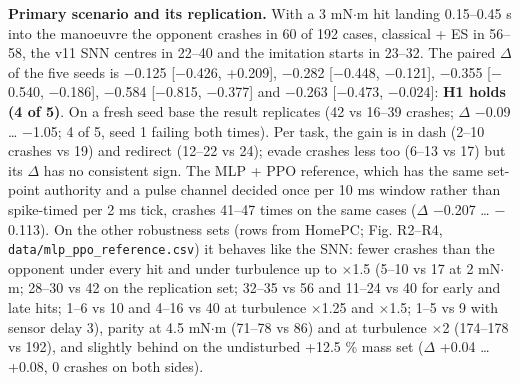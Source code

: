 \documentclass[10pt,a4paper]{article}
\begin{document}
\textbf{Primary scenario and its replication.} With a 3 mN$\cdot$m hit landing 0.15--0.45 s into the manoeuvre the opponent crashes in 60 of 192 cases, classical + ES in 56--58, the v11 SNN centres in 22--40 and the imitation starts in 23--32. The paired $\Delta$ of the five seeds is $-$0.125 [$-$0.426, +0.209], $-$0.282 [$-$0.448, $-$0.121], $-$0.355 [$-$0.540, $-$0.186], $-$0.584 [$-$0.815, $-$0.377] and $-$0.263 [$-$0.473, $-$0.024]: \textbf{H1 holds (4 of 5)}. On a fresh seed base the result replicates (42 vs 16--39 crashes; $\Delta$ $-$0.09 \ldots{} $-$1.05; 4 of 5, seed 1 failing both times). Per task, the gain is in dash (2--10 crashes vs 19) and redirect (12--22 vs 24); evade crashes less too (6--13 vs 17) but its $\Delta$ has no consistent sign. The MLP + PPO reference, which has the same set-point authority and a pulse channel decided once per 10 ms window rather than spike-timed per 2 ms tick, crashes 41--47 times on the same cases ($\Delta$ $-$0.207 \ldots{} $-$0.113). On the other robustness sets (rows from HomePC; Fig. R2--R4, \texttt{data/mlp\_ppo\_reference.csv}) it behaves like the SNN: fewer crashes than the opponent under every hit and under turbulence up to $\times$1.5 (5--10 vs 17 at 2 mN$\cdot$m; 28--30 vs 42 on the replication set; 32--35 vs 56 and 11--24 vs 40 for early and late hits; 1--6 vs 10 and 4--16 vs 40 at turbulence $\times$1.25 and $\times$1.5; 1--5 vs 9 with sensor delay 3), parity at 4.5 mN$\cdot$m (71--78 vs 86) and at turbulence $\times$2 (174--178 vs 192), and slightly behind on the undisturbed +12.5 \% mass set ($\Delta$ +0.04 \ldots{} +0.08, 0 crashes on both sides).
\end{document}
